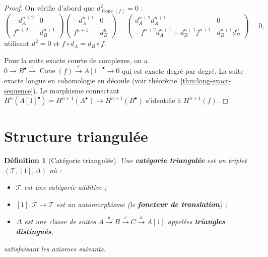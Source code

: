 \documentclass[a4paper,12pt]{book}
\newtheorem{definition}[theoreme]{Définition}
\begin{document}
\begin{proof}
On vérifie d'abord que $d_{\operatorname{Cone}(f)}^2 = 0$ :
\[
  \begin{pmatrix} -d_A^{n+2} & 0 \\ f^{n+2} & d_B^{n+1} \end{pmatrix}
  \begin{pmatrix} -d_A^{n+1} & 0 \\ f^{n+1} & d_B^n \end{pmatrix}
  = \begin{pmatrix} d_A^{n+2} d_A^{n+1} & 0 \\
    -f^{n+2} d_A^{n+1} + d_B^{n+1} f^{n+1} & d_B^{n+1} d_B^n \end{pmatrix}
  = 0,
\]
utilisant $d^2 = 0$ et $f \circ d_A = d_B \circ f$.

Pour la suite exacte courte de complexes, on a
$0 \to B^\bullet \xrightarrow{\iota} \operatorname{Cone}(f) \xrightarrow{\pi} A[1]^\bullet \to 0$
qui est exacte degré par degré. La suite exacte longue en cohomologie
en découle (voir théorème~\ref{thm:long-exact-sequence}).
Le morphisme connectant $H^n(A[1]^\bullet) = H^{n+1}(A^\bullet) \to H^{n+1}(B^\bullet)$
s'identifie à $H^{n+1}(f)$.
\end{proof}


\section{Structure triangulée}\label{sec:triangulated}

\begin{definition}[Catégorie triangulée]\label{def:triangulated}
Une \textbf{catégorie triangulée} est un triplet
$(\mathcal{T}, [1], \Delta)$ où :
\begin{itemize}
\item $\mathcal{T}$ est une catégorie additive ;
\item $[1] \colon \mathcal{T} \to \mathcal{T}$ est un automorphisme
  (le \textbf{foncteur de translation}) ;
\item $\Delta$ est une classe de suites
  $A \xrightarrow{u} B \xrightarrow{v} C \xrightarrow{w} A[1]$
  appelées \textbf{triangles distingués},
\end{itemize}
satisfaisant les axiomes suivants.
\end{definition}
\end{document}
